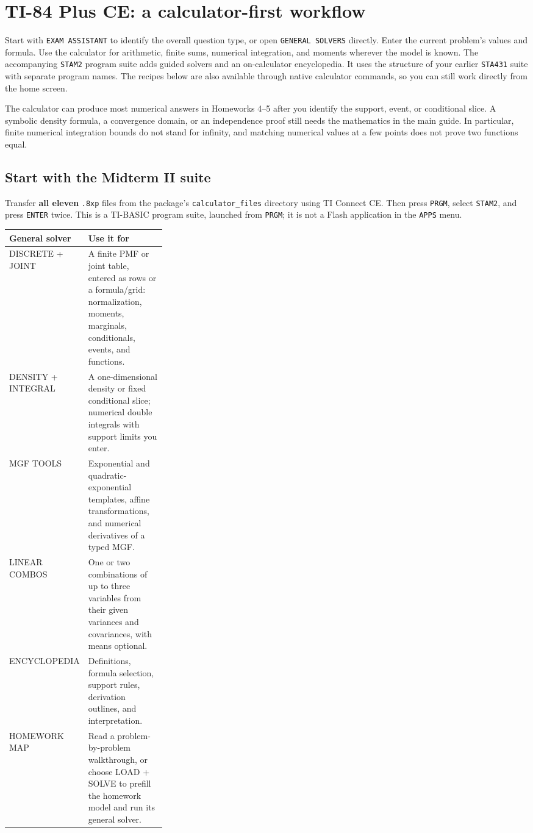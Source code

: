 \section{TI-84 Plus CE: a calculator-first workflow}
\label{sec:calculator}
Start with \texttt{EXAM ASSISTANT} to identify the overall question type, or open \texttt{GENERAL SOLVERS} directly. Enter the current problem's values and formula. Use the calculator for arithmetic, finite sums, numerical integration, and moments wherever the model is known. The accompanying \texttt{STAM2} program suite adds guided solvers and an on-calculator encyclopedia. It uses the structure of your earlier \texttt{STA431} suite with separate program names. The recipes below are also available through native calculator commands, so you can still work directly from the home screen.

The calculator can produce most numerical answers in Homeworks 4--5 after you identify the support, event, or conditional slice. A symbolic density formula, a convergence domain, or an independence proof still needs the mathematics in the main guide. In particular, finite numerical integration bounds do not stand for infinity, and matching numerical values at a few points does not prove two functions equal.

\subsection{Start with the Midterm II suite}
Transfer \textbf{all eleven} \texttt{.8xp} files from the package's \texttt{calculator\_files} directory using TI Connect CE. Then press \texttt{PRGM}, select \texttt{STAM2}, and press \texttt{ENTER} twice. This is a TI-BASIC program suite, launched from \texttt{PRGM}; it is not a Flash application in the \texttt{APPS} menu.

\begin{tabularx}{\linewidth}{@{}p{0.30\linewidth}X@{}}
\toprule General solver & Use it for\\\midrule
DISCRETE + JOINT & A finite PMF or joint table, entered as rows or a formula/grid: normalization, moments, marginals, conditionals, events, and functions.\\
DENSITY + INTEGRAL & A one-dimensional density or fixed conditional slice; numerical double integrals with support limits you enter.\\
MGF TOOLS & Exponential and quadratic-exponential templates, affine transformations, and numerical derivatives of a typed MGF.\\
LINEAR COMBOS & One or two combinations of up to three variables from their given variances and covariances, with means optional.\\
ENCYCLOPEDIA & Definitions, formula selection, support rules, derivation outlines, and interpretation.\\
HOMEWORK MAP & Read a problem-by-problem walkthrough, or choose LOAD + SOLVE to prefill the homework model and run its general solver.\\\bottomrule
\end{tabularx}

